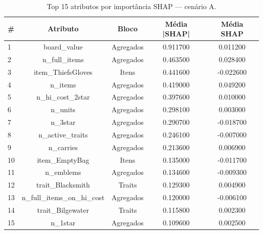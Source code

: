 \begin{table}[htbp]
\caption{Top 15 atributos por importância SHAP — cenário A.}
\label{tab:topA}
\centering
\small
\begin{tabular}{lcccc}
\toprule
\# & Atributo & Bloco & Média |SHAP| & Média SHAP \\
\midrule
1 & board\_value & Agregados & 0.911700 & 0.011200 \\
2 & n\_full\_items & Agregados & 0.463500 & 0.028400 \\
3 & item\_ThiefsGloves & Itens & 0.441600 & -0.022600 \\
4 & n\_items & Agregados & 0.419000 & 0.049200 \\
5 & n\_hi\_cost\_2star & Agregados & 0.397600 & 0.010000 \\
6 & n\_units & Agregados & 0.298100 & 0.003000 \\
7 & n\_3star & Agregados & 0.290700 & -0.018700 \\
8 & n\_active\_traits & Agregados & 0.246100 & -0.007000 \\
9 & n\_carries & Agregados & 0.213600 & 0.006900 \\
10 & item\_EmptyBag & Itens & 0.135000 & -0.011700 \\
11 & n\_emblems & Agregados & 0.134600 & -0.009300 \\
12 & trait\_Blacksmith & Traits & 0.129300 & 0.004900 \\
13 & n\_full\_items\_on\_hi\_cost & Agregados & 0.120000 & -0.006100 \\
14 & trait\_Bilgewater & Traits & 0.115800 & 0.002300 \\
15 & n\_1star & Agregados & 0.109600 & 0.002500 \\
\bottomrule
\end{tabular}
\end{table}
